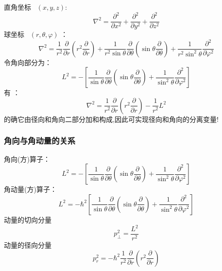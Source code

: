 \begin{frame}
	直角坐标~ $(x,y,z) $: 
	\begin{equation*}
		\nabla ^{2}  = \dfrac{\partial ^2}{\partial x^2} +\dfrac{\partial^2 }{\partial y^2} +\dfrac{\partial^2  }{\partial z^2}
	\end{equation*}
	球坐标~ $(r,\theta, \varphi )$ ：
	\begin{equation*}
		\nabla ^{2} =\frac{1}{r^2} \frac{\partial }{\partial r} (r^2\frac{\partial }{\partial r} )+
		\frac{1}{r^2 \sin \theta  } \frac{\partial }{\partial \theta } (\sin \theta \frac{\partial }{\partial \theta } )
		+\frac{1}{r^2 \sin^2 \theta  } \frac{\partial^2}{\partial\varphi ^2}
	\end{equation*}	
	令角向部分为：
	\begin{equation*}
		L^2 = - \left[ \frac{1}{ \sin \theta  } \frac{\partial }{\partial \theta } (\sin \theta \frac{\partial }{\partial \theta } )
		+\frac{1}{ \sin^2 \theta  } \frac{\partial^2}{\partial\varphi ^2} \right]
	\end{equation*}	
	有 ：
	\begin{equation*}
		\nabla ^{2} =\frac{1}{r^2} \frac{\partial }{\partial r} (r^2\frac{\partial }{\partial r} )-
		\frac{1}{r^2 } L^2 
	\end{equation*}	
	的确它由径向和角向二部分加和构成,因此可实现径向和角向的分离变量!
\end{frame}	

\begin{frame}
	\frametitle{角向与角动量的关系}	
	角向(方)算子：
	\begin{equation*}
		L^2 = - \left[ \frac{1}{ \sin \theta  } \frac{\partial }{\partial \theta } (\sin \theta \frac{\partial }{\partial \theta } )
		+\frac{1}{ \sin^2 \theta  } \frac{\partial^2}{\partial\varphi ^2} \right]
	\end{equation*}	
    角动量(方)算子：
		\begin{equation*}
		L^2 = -\hbar ^2 \left[ \frac{1}{ \sin \theta  } \frac{\partial }{\partial \theta } (\sin \theta \frac{\partial }{\partial \theta } )
		+\frac{1}{ \sin^2 \theta  } \frac{\partial^2}{\partial\varphi ^2} \right]
	\end{equation*}	
	动量的切向分量
	\begin{equation*}
	p_ \perp  ^2 =  \frac{L^2}{r^2}
	\end{equation*}	
	动量的径向分量
	\[ p_r ^2 = -\hbar ^2  \frac{1}{r^2} \frac{\partial }{\partial r} (r^2\frac{\partial }{\partial r} ) \]
\end{frame}		

